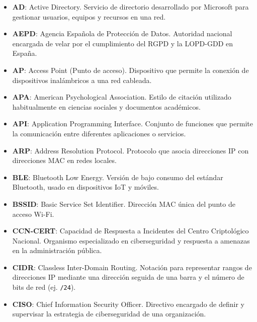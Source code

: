 \documentclass[a4paper, 11pt]{article}
\begin{document}
\begin{itemize}

    \item \textbf{AD}: Active Directory. Servicio de directorio desarrollado por Microsoft para gestionar usuarios, equipos y recursos en una red.

    \item \textbf{AEPD}: Agencia Española de Protección de Datos. Autoridad nacional encargada de velar por el cumplimiento del RGPD y la LOPD-GDD en España.

    \item \textbf{AP}: Access Point (Punto de acceso). Dispositivo que permite la conexión de dispositivos inalámbricos a una red cableada.

    \item \textbf{APA}: American Psychological Association. Estilo de citación utilizado habitualmente en ciencias sociales y documentos académicos.

    \item \textbf{API}: Application Programming Interface. Conjunto de funciones que permite la comunicación entre diferentes aplicaciones o servicios.

    \item \textbf{ARP}: Address Resolution Protocol. Protocolo que asocia direcciones IP con direcciones MAC en redes locales.

    \item \textbf{BLE}: Bluetooth Low Energy. Versión de bajo consumo del estándar Bluetooth, usado en dispositivos IoT y móviles.

    \item \textbf{BSSID}: Basic Service Set Identifier. Dirección MAC única del punto de acceso Wi-Fi.

    \item \textbf{CCN-CERT}: Capacidad de Respuesta a Incidentes del Centro Criptológico Nacional. Organismo especializado en ciberseguridad y respuesta a amenazas en la administración pública.

    \item \textbf{CIDR}: Classless Inter-Domain Routing. Notación para representar rangos de direcciones IP mediante una dirección seguida de una barra y el número de bits de red (ej. \texttt{/24}).

    \item \textbf{CISO}: Chief Information Security Officer. Directivo encargado de definir y supervisar la estrategia de ciberseguridad de una organización.


\end{itemize}
\end{document}
